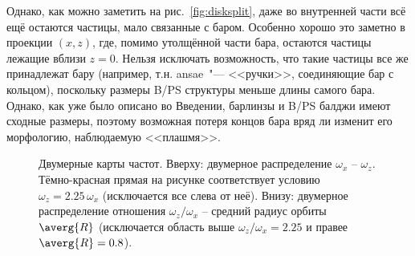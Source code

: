 \documentclass[tikz]{trlnotes}
\begin{document}
Однако, как можно заметить на рис.~\ref{fig:disksplit}, даже во внутренней части всё ещё остаются частицы, мало
связанные с баром. Особенно хорошо это заметно в проекции $(x, z)$, где, помимо утолщённой части бара, остаются
частицы лежащие вблизи $z=0$. Нельзя исключать возможность, что такие частицы все же принадлежат бару (например, т.н.
ansae~"--- <<ручки>>, соединяющие бар с кольцом), поскольку размеры B/PS структуры меньше длины самого бара. Однако, как
уже было описано во Введении, барлинзы и B/PS балджи имеют сходные размеры, поэтому возможная потеря концов бара
вряд ли изменит его морфологию, наблюдаемую <<плашмя>>. 

\begin{figure}[htpb]
  \centering
  \caption{Двумерные карты частот. Вверху: двумерное распределение
    $ω_x$ -- $ω_z$. Тёмно-красная прямая на рисунке соответствует условию
    $ω_z = 2.25\, ω_x$ (исключается все слева от неё). Внизу: двумерное
    распределение отношения $ω_z/ω_x$ -- средний радиус
  орбиты $\averg{R}$ (исключается область выше $ω_z/ω_x = 2.25$ и правее $\averg{R} = 0.8$).}
  \label{fig:innerrefine}
\end{figure}
\end{document}

